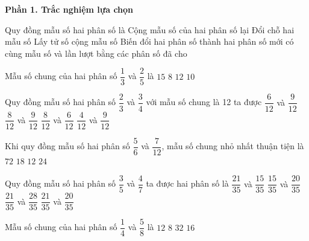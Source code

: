 \textbf{Phần 1. Trắc nghiệm lựa chọn}

\begin{ex} %
Quy đồng mẫu số hai phân số là
\choice
{Cộng mẫu số của hai phân số lại}
{Đổi chỗ hai mẫu số}
{Lấy tử số cộng mẫu số}
{\True Biến đổi hai phân số thành hai phân số mới có cùng mẫu số và lần lượt bằng các phân số đã cho}
\end{ex}

\begin{ex} %
Mẫu số chung của hai phân số $\dfrac{1}{3}$ và $\dfrac{2}{5}$ là
\choice
{\True $15$}
{$8$}
{$12$}
{$10$}
\end{ex}

\begin{ex} %
Quy đồng mẫu số hai phân số $\dfrac{2}{3}$ và $\dfrac{3}{4}$ với mẫu số chung là 12 ta được
\choice
{$\dfrac{6}{12}$ và $\dfrac{9}{12}$}
{\True $\dfrac{8}{12}$ và $\dfrac{9}{12}$}
{$\dfrac{8}{12}$ và $\dfrac{6}{12}$}
{$\dfrac{4}{12}$ và $\dfrac{9}{12}$}
\end{ex}

\begin{ex} %
Khi quy đồng mẫu số hai phân số $\dfrac{5}{6}$ và $\dfrac{7}{12}$, mẫu số chung nhỏ nhất thuận tiện là
\choice
{$72$}
{$18$}
{\True $12$}
{$24$}
\end{ex}

\begin{ex} %
Quy đồng mẫu số hai phân số $\dfrac{3}{5}$ và $\dfrac{4}{7}$ ta được hai phân số là
\choice
{$\dfrac{21}{35}$ và $\dfrac{15}{35}$}
{$\dfrac{15}{35}$ và $\dfrac{20}{35}$}
{$\dfrac{21}{35}$ và $\dfrac{28}{35}$}
{\True $\dfrac{21}{35}$ và $\dfrac{20}{35}$}
\end{ex}

\begin{ex} %
Mẫu số chung của hai phân số $\dfrac{1}{4}$ và $\dfrac{5}{8}$ là
\choice
{$12$}
{\True $8$}
{$32$}
{$16$}
\end{ex}

